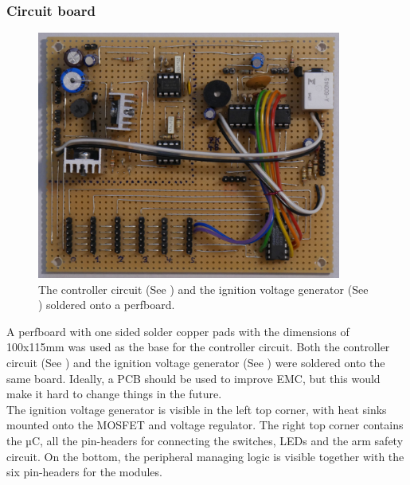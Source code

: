 
\pagebreak

\subsubsection{Circuit board}
\label{Circuitboard}

\begin{figure}[!ht]
    \centering
    \includegraphics[width=10cm]{./Figures/controller_circuit_soldered.JPG}
    \caption{The controller circuit (See ) and the ignition voltage generator (See ) soldered onto a perfboard.   }
    \label{fig:controller_circuit_soldered}     
\end{figure}

\noindent A perfboard with one sided solder copper pads with the dimensions of 100x115mm was used as the base for the controller circuit. Both the controller circuit (See ) and the ignition voltage generator (See ) were soldered onto the same board. Ideally, a PCB should be used to improve EMC, but this would make it hard to change things in the future. \\

\noindent The ignition voltage generator is visible in the left top corner, with heat sinks mounted onto the MOSFET and voltage regulator. The right top corner contains the µC, all the pin-headers for connecting the switches, LEDs and the arm safety circuit. On the bottom, the peripheral managing logic is visible together with the six pin-headers for the modules.

